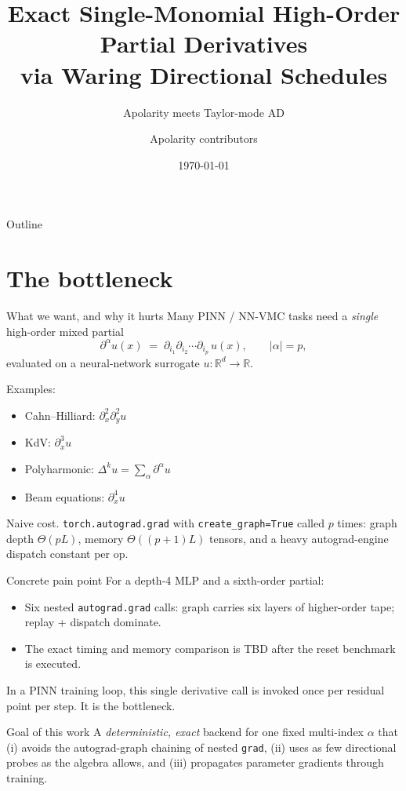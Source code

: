 \documentclass[10pt,aspectratio=169]{beamer}
\title{Exact Single-Monomial High-Order Partial Derivatives \\ via Waring Directional Schedules}
\subtitle{Apolarity meets Taylor-mode AD}
\date{\today}
\author{Apolarity contributors}
\newcommand{\R}{\mathbb{R}}
\newcommand{\dal}{\partial^\alpha}
\begin{document}
\begin{frame}
  \titlepage
\end{frame}

\begin{frame}{Outline}
  \tableofcontents
\end{frame}

\section{The bottleneck}

\begin{frame}{What we want, and why it hurts}
  Many PINN / NN-VMC tasks need a \emph{single} high-order mixed partial
  \[
     \dal u(x) \;=\; \partial_{i_1}\partial_{i_2}\cdots\partial_{i_p}\, u(x),
     \qquad |\alpha|=p,
  \]
  evaluated on a neural-network surrogate $u : \R^d \to \R$.

  \medskip
  Examples:
  \begin{itemize}
    \item Cahn--Hilliard: $\partial_x^2\partial_y^2 u$
    \item KdV: $\partial_x^3 u$
    \item Polyharmonic: $\Delta^k u = \sum_\alpha \dal u$
    \item Beam equations: $\partial_x^4 u$
  \end{itemize}

  \medskip
  \alert{Naive cost.} \texttt{torch.autograd.grad} with
  \texttt{create\_graph=True} called $p$ times: graph depth $\Theta(pL)$,
  memory $\Theta((p+1)L)$ tensors, and a heavy autograd-engine dispatch
  constant per op.
\end{frame}

\begin{frame}{Concrete pain point}
  For a depth-4 MLP and a sixth-order partial:
  \begin{itemize}
    \item Six nested \texttt{autograd.grad} calls: graph carries six layers
          of higher-order tape; replay + dispatch dominate.
    \item The exact timing and memory comparison is \alert{TBD} after the
          reset benchmark is executed.
  \end{itemize}

  \medskip
  In a PINN training loop, this single derivative call is invoked once per
  residual point per step. \alert{It is the bottleneck.}

  \bigskip
  \begin{block}{Goal of this work}
    A \emph{deterministic, exact} backend for one fixed multi-index $\alpha$
    that
    (i) avoids the autograd-graph chaining of nested \texttt{grad},
    (ii) uses as few directional probes as the algebra allows,
    and (iii) propagates parameter gradients through training.
  \end{block}
\end{frame}
\end{document}
